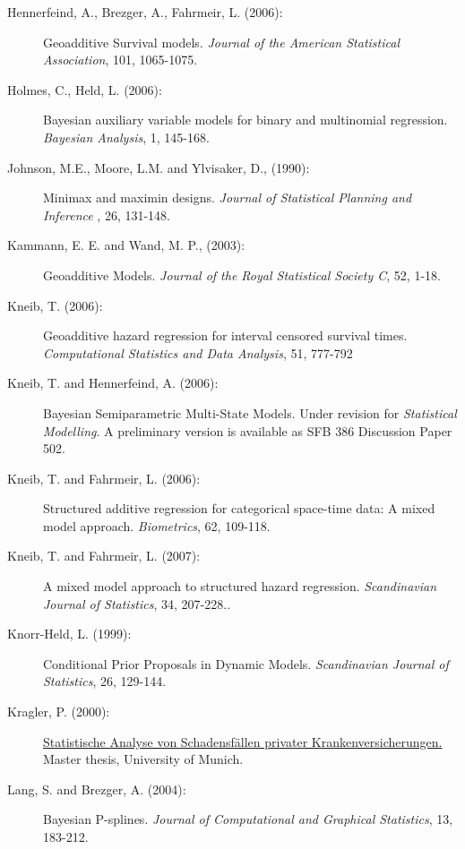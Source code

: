 \documentclass[11pt,a4paper,twoside]{bayesxarticle}
\begin{document}
\begin{description}
\item[Hennerfeind, A., Brezger, A., Fahrmeir, L. (2006):]
Geoadditive Survival models. {\em Journal of the American
Statistical Association}, 101, 1065-1075.

\item[Holmes, C., Held, L. (2006):]
Bayesian auxiliary variable models for binary and multinomial
regression. {\em Bayesian Analysis}, 1, 145-168.

\item[Johnson, M.E., Moore, L.M. and
Ylvisaker, D., (1990):] Minimax and maximin designs. {\it Journal of
Statistical Planning and Inference} , 26, 131-148.

\item[Kammann, E. E. and Wand, M. P., (2003):] Geoadditive Models. {\it Journal of the Royal
Statistical Society C}, 52, 1-18.

\item[Kneib, T. (2006):] Geoadditive hazard regression for interval
censored survival times. {\em Computational Statistics and Data
Analysis}, 51, 777-792

\item[Kneib, T. and Hennerfeind, A. (2006):] Bayesian Semiparametric
Multi-State Models. Under revision for {\em Statistical Modelling}.
A preliminary version is available as SFB 386 Discussion Paper 502.

\item[Kneib, T. and Fahrmeir, L. (2006):] Structured additive
regression for categorical space-time data: A mixed model approach.
{\it Biometrics}, 62, 109-118.

\item[Kneib, T. and Fahrmeir, L. (2007):] A mixed model approach
to structured hazard regression. {\em Scandinavian Journal of
Statistics}, 34, 207-228..

\item[Knorr-Held, L. (1999):] Conditional Prior Proposals in
Dynamic Models. {\em Scandinavian Journal of Statistics}, 26,
129-144.

\item[Kragler, P. (2000):] \href{http://www.scor.fr/us/2_laureat.asp?pays=2}
{Statistische Analyse von Schadensf\"allen privater
Krankenversicherungen.} Master thesis, University of Munich.

\item[Lang, S. and Brezger, A. (2004):] Bayesian P-splines. {\it
Journal of Computational and Graphical Statistics}, 13, 183-212.


\end{description}
\end{document}
